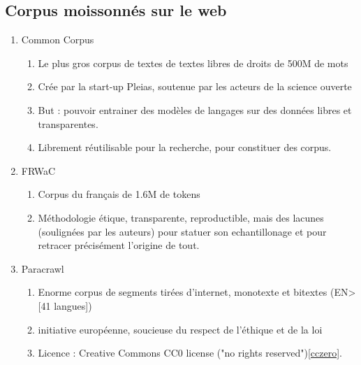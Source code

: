 \documentclass{book}
\begin{document}
\subsection{Corpus moissonnés sur le web }%
\begin{enumerate}

    \item Common Corpus
        \begin{enumerate}
            \item Le plus gros corpus de textes de textes libres de droits de 500M de mots
            \item Crée par la start-up Pleias, soutenue par les acteurs de la science ouverte
            \item But : pouvoir entrainer des modèles de langages sur des données libres et transparentes.
            \item Librement réutilisable pour la recherche, pour constituer des corpus.
        \end{enumerate}
    \item FRWaC
        \begin{enumerate}
            \item Corpus du français de 1.6M de tokens
            \item Méthodologie étique, transparente, reproductible, mais des lacunes (soulignées par les auteurs) pour statuer son echantillonage et pour retracer précisément l'origine de tout.
        \end{enumerate}
    \item Paracrawl
        \begin{enumerate}
            \item Enorme corpus de segments tirées d'internet, monotexte et bitextes (EN>[41 langues]) 
            \item initiative européenne, soucieuse du respect de l'éthique et de la loi
            \item Licence : Creative Commons CC0 license ("no rights reserved")\ref{cczero}.
        \end{enumerate}
        

\end{enumerate}
\end{document}
